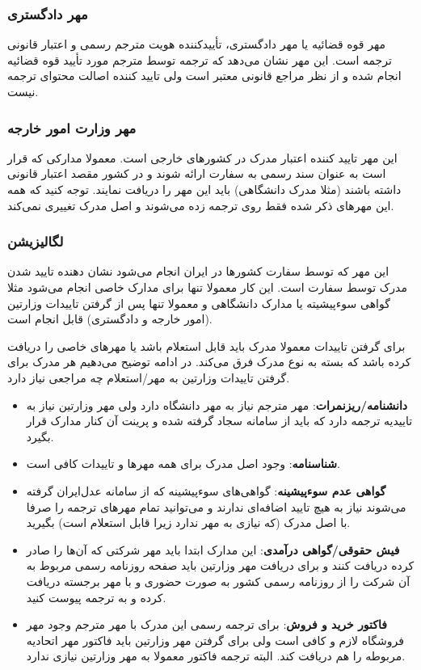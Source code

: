 \subsubsection{مهر دادگستری}
مهر قوه قضائیه یا مهر دادگستری، تأییدکننده هویت مترجم رسمی و اعتبار قانونی ترجمه است.
 این مهر نشان می‌دهد که ترجمه توسط مترجم مورد تأیید قوه قضائیه انجام شده و از نظر مراجع قانونی معتبر است ولی تایید کننده اصالت 
 محتوای ترجمه نیست.

\subsubsection{مهر وزارت امور خارجه}
این مهر تایید کننده اعتبار مدرک در کشور‌های خارجی است. معمولا مدارکی که قرار است به عنوان سند رسمی به سفارت ارائه شوند و در 
کشور مقصد اعتبار قانونی داشته باشند (مثلا مدرک دانشگاهی) باید این مهر را دریافت نمایند. توجه کنید که همه این مهر‌های 
ذکر شده فقط روی ترجمه زده می‌شوند و اصل مدرک تغییری نمی‌کند. 

\subsubsection{لگالیزیشن }
این مهر که توسط سفارت کشور‌ها در ایران انجام می‌شود نشان‌ دهنده تایید شدن مدرک توسط سفارت است. این کار معمولا تنها برای مدارک خاصی انجام می‌شود
مثلا گواهی سوءپیشیته یا مدارک دانشگاهی و معمولا تنها پس از گرفتن تاییدات وزارتین (امور خارجه و دادگستری) قابل انجام است. 


برای گرفتن تاییدات معمولا مدرک باید قابل استعلام باشد یا مهرهای خاصی را دریافت کرده باشد که بسته به نوع مدرک فرق می‌کند. در ادامه توضیح می‌دهیم
هر مدرک برای گرفتن تاییدات وزارتین به مهر/استعلام چه مراجعی نیاز دارد. 

\begin{itemize}
    \item \textbf{دانشنامه/ریزنمرات}: مهر مترجم نیاز به مهر دانشگاه دارد ولی مهر وزارتین نیاز به تاییدیه ترجمه دارد که باید 
    از سامانه سجاد گرفته شده و پرینت آن کنار مدارک قرار بگیرد. 

    \item \textbf{شناسنامه}: وجود اصل مدرک برای همه مهر‌ها و تاییدات کافی است. 

    \item \textbf{گواهی عدم سوءپیشینه}: گواهی‌های سوءپیشینه که از سامانه عدل‌ایران گرفته می‌شوند نیاز به هیچ تایید اضافه‌ای ندارند 
    و می‌توانید تمام مهر‌های ترجمه را صرفا با اصل مدرک (که نیازی به مهر ندارد زیرا قابل استعلام است) بگیرید. 

    \item \textbf{فیش حقوقی/گواهی درآمدی}: این مدارک ابتدا باید مهر شرکتی که آن‌ها را صادر کرده دریافت کنند و برای دریافت 
    مهر وزارتین باید صفحه روزنامه رسمی مربوط به آن شرکت را از روزنامه رسمی کشور به صورت حضوری و با مهر برجسته دریافت کرده و به 
    ترجمه پیوست کنید. 

    \item \textbf{فاکتور خرید و فروش}: برای ترجمه رسمی این مدرک با مهر مترجم وجود مهر فروشگاه لازم و کافی است ولی برای
    گرفتن مهر وزارتین باید فاکتور مهر اتحادیه مربوطه را هم دریافت کند. البته ترجمه فاکتور معمولا به مهر وزارتین نیازی ندارد. 

\end{itemize}